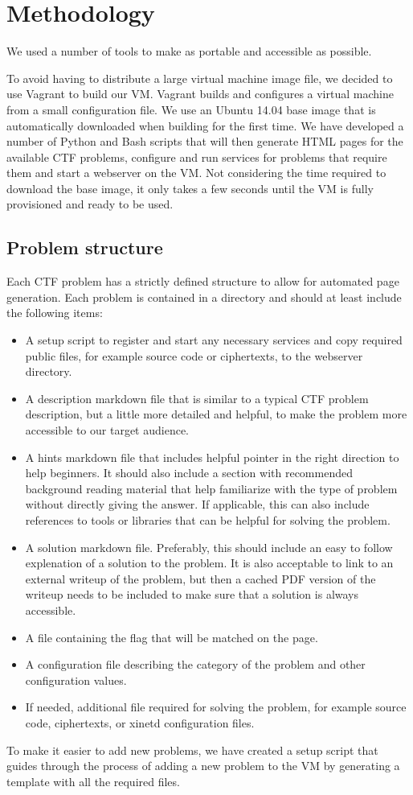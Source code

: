 \section{Methodology}
\label{sec:methodology}
We used a number of tools to make \cvm{} as portable and accessible as possible.

To avoid having to distribute a large virtual machine image file, we decided to use Vagrant to build our VM. Vagrant builds and configures a virtual machine from a small configuration file. We use an Ubuntu 14.04 base image that is automatically downloaded when building \cvm{} for the first time. We have developed a number of Python and Bash scripts that will then generate HTML pages for the available CTF problems, configure and run services for problems that require them and start a webserver on the VM. Not considering the time required to download the base image, it only takes a few seconds until the VM is fully provisioned and ready to be used. 

\subsection{Problem structure}
Each CTF problem has a strictly defined structure to allow for automated page generation. Each problem is contained in a directory and should at least include the following items:

\begin{itemize}
  \item A setup script to register and start any necessary services and copy required public files, for example source code or ciphertexts, to the webserver directory. 
  \item A description markdown file that is similar to a typical CTF problem description, but a little more detailed and helpful, to make the problem more accessible to our target audience.
  \item A hints markdown file that includes helpful pointer in the right direction to help beginners. It should also include a section with recommended background reading material that help familiarize with the type of problem without directly giving the answer. If applicable, this can also include references to tools or libraries that can be helpful for solving the problem.
  \item A solution markdown file. Preferably, this should include an easy to follow explenation of a solution to the problem. It is also acceptable to link to an external writeup of the problem, but then a cached PDF version of the writeup needs to be included to make sure that a solution is always accessible.
  \item A file containing the flag that will be matched on the page.
  \item A configuration file describing the category of the problem and other configuration values.
  \item If needed, additional file required for solving the problem, for example source code, ciphertexts, or xinetd configuration files.
\end{itemize}

To make it easier to add new problems, we have created a setup script that guides through the process of adding a new problem to the VM by generating a template with all the required files.

